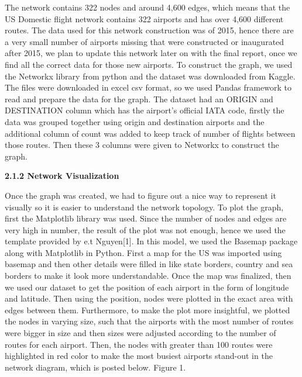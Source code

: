 \documentclass[sigconf,nonacm]{acmart}
\begin{document}
The network contains 322 nodes and around 4,600 edges, which means that the US Domestic flight network contains 322 airports and has over 4,600 different routes. The data used for this network construction was of 2015, hence there are a very small number of airports missing that were constructed or inaugurated after 2015, we plan to update this network later on with the final report, once we find all the correct data for those new airports. To construct the graph, we used the Networkx library from python and the dataset was downloaded from Kaggle. The files were downloaded in excel csv format, so we used Pandas framework to read and prepare the data for the graph. The dataset had an ORIGIN and DESTINATION column which has the airport’s official IATA code, firstly the data was grouped together using origin and destination airports and the additional column of count was added to keep track of number of flights between those routes. Then these 3 columns were given to Networkx to construct the graph.
\hfill \break

\textbf{2.1.2 Network Visualization} 

\hfill \break

Once the graph was created, we had to figure out a nice way to represent it visually so it is easier to understand the network topology. To plot the graph, first the Matplotlib library was used. Since the number of nodes and edges are very high in number, the result of the plot was not enough, hence we used the template provided by e.t Nguyen[1]. In this model, we used the Basemap package along with Matplotlib in Python. First a map for the US was imported using basemap and then other details were filled in like state borders, country and sea borders to make it look more understandable. Once the map was finalized, then we used our dataset to get the position of each airport in the form of longitude and latitude. Then using the position, nodes were plotted in the exact area with edges between them. Furthermore, to make the plot more insightful, we plotted the nodes in varying size, such that the airports with the most number of routes were bigger in size and then sizes were adjusted according to the number of routes for each airport. Then, the nodes with greater than 100 routes were highlighted in red color to make the most busiest airports stand-out in the network diagram, which is posted below. Figure 1.
\end{document}
